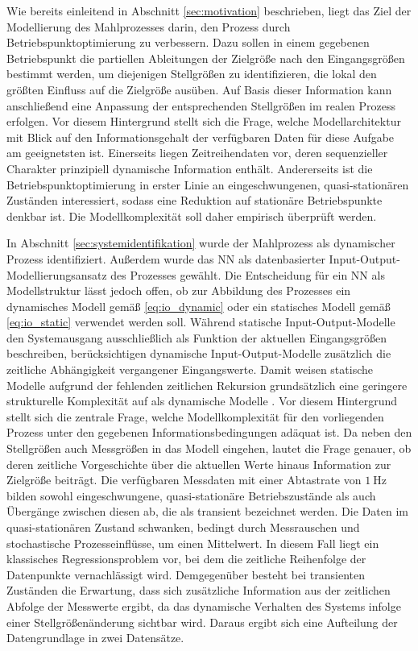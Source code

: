 Wie bereits einleitend in Abschnitt \ref{sec:motivation} beschrieben, liegt das Ziel der Modellierung des Mahlprozesses darin, den Prozess durch Betriebspunktoptimierung zu verbessern. Dazu sollen in einem gegebenen Betriebspunkt die partiellen Ableitungen der Zielgröße nach den Eingangsgrößen bestimmt werden, um diejenigen Stellgrößen zu identifizieren, die lokal den größten Einfluss auf die Zielgröße ausüben. Auf Basis dieser Information kann anschließend eine Anpassung der entsprechenden Stellgrößen im realen Prozess erfolgen. Vor diesem Hintergrund stellt sich die Frage, welche Modellarchitektur mit Blick auf den Informationsgehalt der verfügbaren Daten für diese Aufgabe am geeignetsten ist. Einerseits liegen Zeitreihendaten vor, deren sequenzieller Charakter prinzipiell dynamische Information enthält. Andererseits ist die Betriebspunktoptimierung in erster Linie an eingeschwungenen, quasi-stationären Zuständen interessiert, sodass eine Reduktion auf stationäre Betriebspunkte denkbar ist. Die Modellkomplexität soll daher empirisch überprüft werden. \par
In Abschnitt \ref{sec:systemidentifikation} wurde der Mahlprozess als dynamischer Prozess identifiziert. Außerdem wurde das \ac{NN} als datenbasierter Input-Output-Modellierungsansatz des Prozesses gewählt. Die Entscheidung für ein \ac{NN} als Modellstruktur lässt jedoch offen, ob zur Abbildung des Prozesses ein dynamisches Modell gemäß \eqref{eq:io_dynamic} oder ein statisches Modell gemäß \eqref{eq:io_static} verwendet werden soll. Während statische Input-Output-Modelle den Systemausgang ausschließlich als Funktion der aktuellen Eingangsgrößen beschreiben, berücksichtigen dynamische Input-Output-Modelle zusätzlich die zeitliche Abhängigkeit vergangener Eingangswerte. Damit weisen statische Modelle aufgrund der fehlenden zeitlichen Rekursion grundsätzlich eine geringere strukturelle Komplexität auf als dynamische Modelle \cite{nelles.2020}.
Vor diesem Hintergrund stellt sich die zentrale Frage, welche Modellkomplexität für den vorliegenden Prozess unter den gegebenen Informationsbedingungen adäquat ist. Da neben den Stellgrößen auch Messgrößen in das Modell eingehen, lautet die Frage genauer, ob deren zeitliche Vorgeschichte über die aktuellen Werte hinaus Information zur Zielgröße beiträgt. Die verfügbaren Messdaten mit einer Abtastrate von $\SI{1}{\hertz}$ bilden sowohl eingeschwungene, quasi-stationäre Betriebszustände als auch Übergänge zwischen diesen ab, die als transient bezeichnet werden.
Die Daten im quasi-stationären Zustand schwanken, bedingt durch Messrauschen und stochastische Prozesseinflüsse, um einen Mittelwert. In diesem Fall liegt ein klassisches Regressionsproblem vor, bei dem die zeitliche Reihenfolge der Datenpunkte vernachlässigt wird. Demgegenüber besteht bei transienten Zuständen die Erwartung, dass sich zusätzliche Information aus der zeitlichen Abfolge der Messwerte ergibt, da das dynamische Verhalten des Systems infolge einer Stellgrößenänderung sichtbar wird. Daraus ergibt sich eine Aufteilung der Datengrundlage in zwei Datensätze. \par
